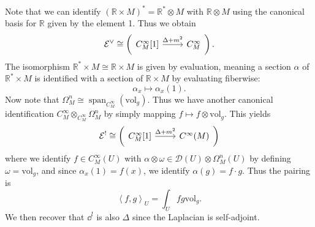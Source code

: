 \begin{remark}
	Note that we can identify $(\mathbb{R} \times M)^* = \mathbb{R} ^*\otimes M$ with $\mathbb{R} \otimes M$ using the canonical basis for $\mathbb{R} $ given by the element 1. Thus we obtain
	\[
		\mathcal{E} ^\vee \cong \left( 
			\begin{tikzcd}
				C^\infty _M[1]\ar[" \Delta +m^2 ", r] & C^\infty _M
			\end{tikzcd}
		\right) 
	.\]
	The isomorphism $\mathbb{R} ^*\times M \cong \mathbb{R} \times M$ is given by evaluation, meaning a section $\alpha $ of $\mathbb{R} ^*\times M$ is identified with a section of $\mathbb{R} \times M$ by evaluating fiberwise:
	\[
		\alpha _x \mapsto \alpha _x(1)
	.\]
	Now note that $\Omega ^n_M\cong \operatorname{span}_{C^\infty _M} (\mathrm{vol} _g)$. Thus we have another canonical identification $C^\infty _M \otimes_{C^\infty _M} \Omega ^n_M$ by simply mapping $f\mapsto f\otimes \mathrm{vol} _g$. This yields
	\[
		\mathcal{E} ^! \cong \left( 
			\begin{tikzcd}
				C^\infty _M[1]\ar[" \Delta +m^2 ", r] & C^\infty (M)
			\end{tikzcd}
		\right) 
	\]
	where we identify $f\in C^\infty _M(U)$ with $\alpha \otimes \omega \in \mathcal{D} (U)\otimes \Omega _M^n(U)$ by defining $\omega =\mathrm{vol} _g$, and since $\alpha _x(1) = f(x)$, we identify $\alpha (g) = f\cdot g$. Thus the pairing is
	\[
		\left\langle f,g \right\rangle_U =\int_{U} fg\mathrm{vol} _g
	.\]
	We then recover that $\dd ^!$ is also $\Delta $ since the Laplacian is self-adjoint.
\end{remark}

